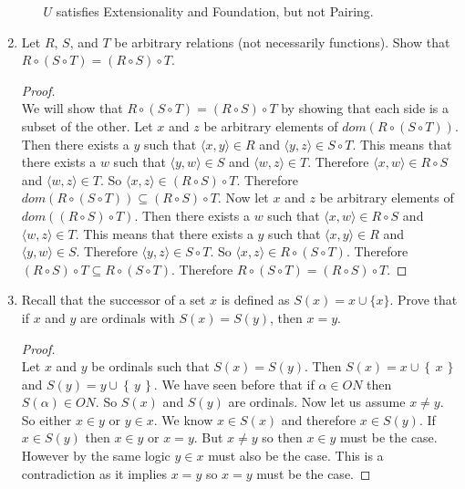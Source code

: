 \documentclass[11pt]{amsart}
\newcommand{\set}[1]{\left\{\,#1\,\right\}}
\begin{document}
\begin{enumerate}
\begin{enumerate}
$U$ satisfies Extensionality and Foundation, but not Pairing.
\vfill
\end{enumerate}

\newpage


\item Let $R$, $S$, and $T$ be arbitrary relations (not necessarily functions). Show that $R \circ (S \circ T) = (R \circ S) \circ T$.

\begin{proof}
\ \\
We will show that $R \circ (S \circ T) = (R \circ S) \circ T$ by showing that each side is a subset of the other.
Let $x$ and $z$ be arbitrary elements of $dom(R \circ (S \circ T))$.
Then there exists a $y$ such that $\langle x,y \rangle \in R$ and $\langle y,z \rangle \in S \circ T$.
This means that there exists a $w$ such that $\langle y,w \rangle \in S$ and $\langle w,z \rangle \in T$.
Therefore $\langle x,w \rangle \in R \circ S$ and $\langle w,z \rangle \in T$.
So $\langle x,z \rangle \in (R \circ S) \circ T$.
Therefore $dom(R \circ (S \circ T)) \subseteq (R \circ S) \circ T$.
Now let $x$ and $z$ be arbitrary elements of $dom((R \circ S) \circ T)$.
Then there exists a $w$ such that $\langle x,w \rangle \in R \circ S$ and $\langle w,z \rangle \in T$.
This means that there exists a $y$ such that $\langle x,y \rangle \in R$ and $\langle y,w \rangle \in S$.
Therefore $\langle y,z \rangle \in S \circ T$.
So $\langle x,z \rangle \in R \circ (S \circ T)$.
Therefore $(R \circ S) \circ T \subseteq R \circ (S \circ T)$.
Therefore $R \circ (S \circ T) = (R \circ S) \circ T$.
\end{proof}

\newpage

\item Recall that the successor of a set $x$ is defined as $S(x) = x \cup \{ x \}$. Prove that if $x$ and $y$ are ordinals with $S(x)=S(y)$, then $x=y$. 

\vspace{1em}
\begin{proof}
\ \\
Let $x$ and $y$ be ordinals such that $S(x) = S(y)$.
Then $S(x) = x \cup \set{x}$ and $S(y) = y \cup \set{y}$.
We have seen before that if $\alpha \in ON$ then $S(\alpha) \in ON$.
So $S(x)$ and $S(y)$ are ordinals.
Now let us assume $x \neq y$.
So either $x \in y$ or $y \in x$.
We know $x \in S(x)$ and therefore $x \in S(y)$.
If $x \in S(y)$ then $x \in y$ or $x = y$.
But $x \neq y$ so then $x \in y$ must be the case.
However by the same logic $y \in x$ must also be the case.
This is a contradiction as it implies $x = y$ so $x = y$ must be the case.
\end{proof}
\newpage



\end{enumerate}
\end{document}
